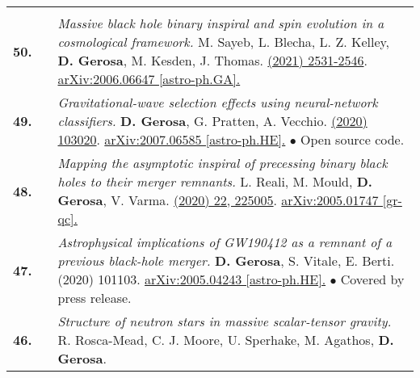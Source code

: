 {\begin{longtable}{rp{0.3cm}p{15.8cm}}
\vspace{0.09cm}\\
%
\textbf{50.} & & \textit{Massive black hole binary inspiral and spin evolution in a cosmological framework.}
\newline{}
M. Sayeb, L. Blecha, L. Z. Kelley, \textbf{D. Gerosa}, M. Kesden, J. Thomas.
\newline{}
\href{https://doi.org/10.1093/mnras/staa3826}{\mnras 501 (2021) 2531-2546}. \href{https://arxiv.org/abs/2006.06647}{arXiv:2006.06647 [astro-ph.GA].}
\vspace{0.09cm}\\
%
\textbf{49.} & & \textit{Gravitational-wave selection effects using neural-network classifiers.}
\newline{}
\textbf{D. Gerosa}, G. Pratten, A. Vecchio.
\newline{}
\href{https://journals.aps.org/prd/abstract/10.1103/PhysRevD.102.103020}{\prd 102 (2020) 103020}. \href{https://arxiv.org/abs/2007.06585}{arXiv:2007.06585 [astro-ph.HE].}
\newline{}
\textcolor{color1}{$\bullet$} Open source code.
\vspace{0.09cm}\\
%
\textbf{48.} & & \textit{Mapping the asymptotic inspiral of precessing binary black holes to their merger remnants.}
\newline{}
L. Reali, M. Mould, \textbf{D. Gerosa}, V. Varma.
\newline{}
\href{https://iopscience.iop.org/article/10.1088/1361-6382/abb639/meta}{\cqg 37 (2020) 22, 225005}. \href{https://arxiv.org/abs/2005.01747}{arXiv:2005.01747 [gr-qc].}
\vspace{0.09cm}\\
%
\textbf{47.} & & \textit{Astrophysical implications of GW190412 as a remnant of a previous black-hole merger.}
\newline{}
\textbf{D. Gerosa}, S. Vitale, E. Berti.
\newline{}
{\prl 125 (2020) 101103}. \href{https://arxiv.org/abs/2005.04243}{arXiv:2005.04243 [astro-ph.HE].}
\newline{}
\textcolor{color1}{$\bullet$} Covered by press release.
\vspace{0.09cm}\\
%
\textbf{46.} & & \textit{Structure of neutron stars in massive scalar-tensor gravity.}
\newline{}
R. Rosca-Mead, C. J. Moore, U. Sperhake, M. Agathos, \textbf{D. Gerosa}.
\newline{}

\end{longtable}}
